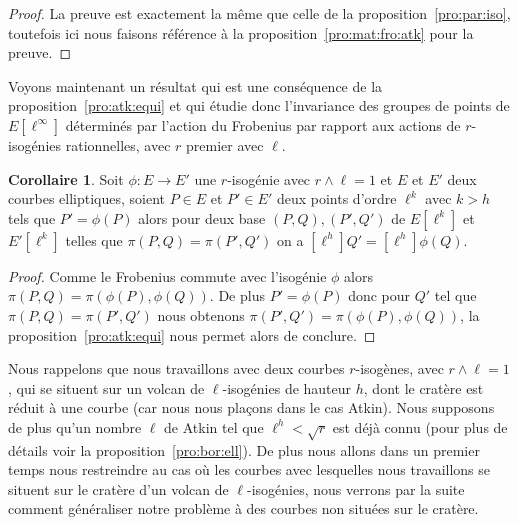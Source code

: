 \documentclass[10pt,a4paper]{book}
\theoremstyle{plain}
\theoremstyle{definition}
\theoremstyle{definition}
\theoremstyle{definition}
\newtheorem{cor}[thm]{Corollaire}
\theoremstyle{definition}
\theoremstyle{definition}
\theoremstyle{remark}
\theoremstyle{remark}
\theoremstyle{definition}
\begin{document}
\begin{proof}
La preuve est exactement la même que celle de la proposition~\ref{pro:par:iso},
toutefois ici nous faisons référence à la proposition~\ref{pro:mat:fro:atk} 
pour la preuve.
\end{proof}

Voyons maintenant un résultat qui est une conséquence de la 
proposition~\ref{pro:atk:equi} et qui étudie donc l'invariance des groupes 
de points de $E[\ell^{\infty}]$ déterminés par l'action du Frobenius 
par rapport aux actions de $r$-isogénies rationnelles, avec $r$ premier avec 
$\ell$.

\begin{cor}\label{cor:atk:ess}
Soit $\phi:E \rightarrow E'$ une $r$-isogénie avec $r \wedge \ell=1$ et $E$ et 
$E'$ deux courbes elliptiques, 
soient $P \in E$ et $P' \in E'$ deux points d'ordre $\ell^k$ avec $k>h$ tels 
que $P'=\phi(P)$ alors pour deux base $(P,Q),(P',Q')$ de $E[\ell^k]$ et 
$E'[\ell^k]$ telles que $\pi(P,Q)=\pi(P',Q')$ on a $[\ell^h]Q'=[\ell^h]\phi(Q)$. 
\end{cor}

\begin{proof}
Comme le Frobenius commute avec l'isogénie $\phi$ alors $\pi(P,Q)=
\pi(\phi(P),\phi(Q))$.
De plus $P'=\phi(P)$ donc pour $Q'$ tel que $\pi(P,Q)=\pi(P',Q')$ nous obtenons 
$\pi(P',Q')=\pi(\phi(P),\phi(Q))$, la proposition~\ref{pro:atk:equi} nous 
permet alors de conclure.
\end{proof}


Nous rappelons que nous travaillons avec deux courbes $r$-isogènes, avec $r 
\wedge \ell=1$, qui se situent sur un volcan de $\ell$-isogénies de hauteur 
$h$, dont le cratère est réduit à une courbe (car nous nous plaçons dans le cas
Atkin). Nous supposons de plus qu'un nombre $\ell$ de Atkin tel que 
$\ell^h<\sqrt{r}$ est déjà connu (pour plus de détails voir la 
proposition~\ref{pro:bor:ell}). De plus nous allons dans un premier temps nous 
restreindre au cas où les courbes avec lesquelles nous travaillons se situent 
sur le cratère d'un volcan de $\ell$-isogénies, nous verrons par la suite 
comment généraliser notre problème à des courbes non situées sur le cratère.
\end{document}
